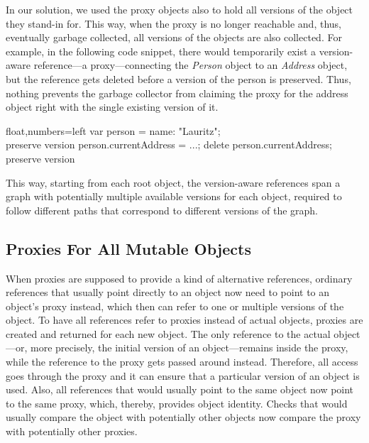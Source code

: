 In our solution, we used the proxy objects also to hold all versions of the object they stand-in for.
This way, when the proxy is no longer reachable and, thus, eventually garbage collected, all versions of the objects are also collected.
For example, in the following code snippet, there would temporarily exist a version-aware reference---a proxy---connecting the \emph{Person} object to an \emph{Address} object, but the reference gets deleted before a version of the person is preserved.
Thus, nothing prevents the garbage collector from claiming the proxy for the address object right with the single existing version of it.

\begin{code}{}{float,numbers=left}
    var person = {name: "Lauritz"};
    \\ preserve version
    person.currentAddress = ...;
    delete person.currentAddress;
    \\ preserve version
\end{code}
\iffalse
\end{verbatim}\fi
This way, starting from each root object, the version-aware references span a graph with potentially multiple available versions for each object, required to follow different paths that correspond to different versions of the graph.



\subsection{Proxies For All Mutable Objects}


When proxies are supposed to provide a kind of alternative references, ordinary references that usually point directly to an object now need to point to an object's proxy instead, which then can refer to one or multiple versions of the object.
To have all references refer to proxies instead of actual objects, proxies are created and returned for each new object.
The only reference to the actual object---or, more precisely, the initial version of an object---remains inside the proxy, while the reference to the proxy gets passed around instead.
Therefore, all access goes through the proxy and it can ensure that a particular version of an object is used.
Also, all references that would usually point to the same object now point to the same proxy, which, thereby, provides object identity.
Checks that would usually compare the object with potentially other objects now compare the proxy with potentially other proxies.

